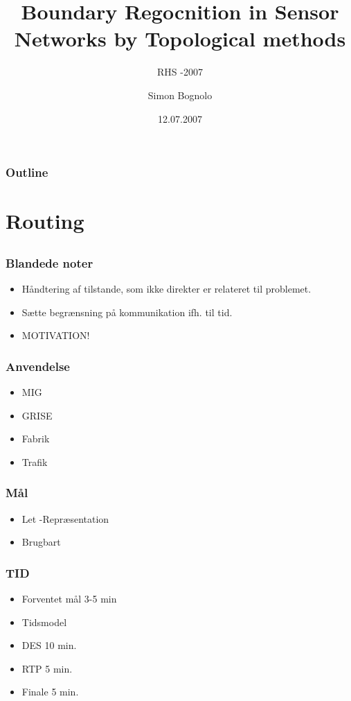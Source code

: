\documentclass{beamer}
\title
{Boundary Regocnition in Sensor Networks by Topological methods}
\subtitle
{RHS -2007}
\author
{Simon Bognolo}
\date
{12.07.2007}
\begin{document}
\begin{frame}
  \titlepage
\end{frame}

\begin{frame}
  \frametitle{Outline}
  \tableofcontents
\end{frame}

\section{Routing}

\subsection[Proactive]{}
\begin{frame}
  \frametitle{Blandede noter}
  \begin{itemize}
    \item Håndtering af tilstande, som ikke direkter er relateret til problemet.
    \item Sætte begrænsning på kommunikation ifh. til tid.
    \item MOTIVATION!
  \end{itemize}
\end{frame}

\begin{frame}
  \frametitle{Anvendelse}
  \begin{itemize}
	\item MIG
	\item GRISE
	\item Fabrik
	\item Trafik
  \end{itemize}
\end{frame}

\begin{frame}
  \frametitle{Mål}
  \begin{itemize}
	\item Let -Repræsentation
	\item Brugbart
  \end{itemize}
\end{frame}

\begin{frame}
  \frametitle{TID}
  \begin{itemize}
	\item Forventet mål 3-5 min
	\item Tidsmodel
	\item DES 10 min.
	\item RTP 5 min.
	\item Finale 5 min.
  \end{itemize}
\end{frame}
\end{document}

